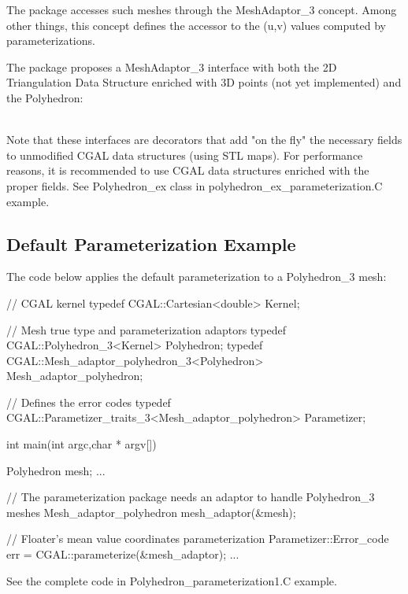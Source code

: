 The package accesses such meshes through the MeshAdaptor\_3 concept. Among other
things, this concept defines the accessor to the (u,v) values computed
by parameterizations.

The package proposes
a MeshAdaptor\_3 interface with both the 2D Triangulation Data Structure enriched
with 3D points (not yet implemented) and the Polyhedron:

  \\

Note that these interfaces are decorators that add "on the fly" the necessary
fields to unmodified CGAL data structures (using STL maps).
For performance reasons, it is recommended to use CGAL data structures
enriched with the proper fields.
See Polyhedron\_ex class in polyhedron\_ex\_parameterization.C example.


\subsection{Default Parameterization Example}

The code below applies the default parameterization to a Polyhedron\_3 mesh:

\begin{ccExampleCode}

// CGAL kernel
typedef CGAL::Cartesian<double>                             Kernel;

// Mesh true type and parameterization adaptors
typedef CGAL::Polyhedron_3<Kernel>                          Polyhedron;
typedef CGAL::Mesh_adaptor_polyhedron_3<Polyhedron>         Mesh_adaptor_polyhedron;

// Defines the error codes
typedef CGAL::Parametizer_traits_3<Mesh_adaptor_polyhedron> Parametizer;

int main(int argc,char * argv[])
{
    Polyhedron mesh;
    ...

    // The parameterization package needs an adaptor to handle Polyhedron_3 meshes
    Mesh_adaptor_polyhedron mesh_adaptor(&mesh);

    // Floater's mean value coordinates parameterization
    Parametizer::Error_code err = CGAL::parameterize(&mesh_adaptor);
    ...
}

\end{ccExampleCode}

See the complete code in Polyhedron\_parameterization1.C example.


